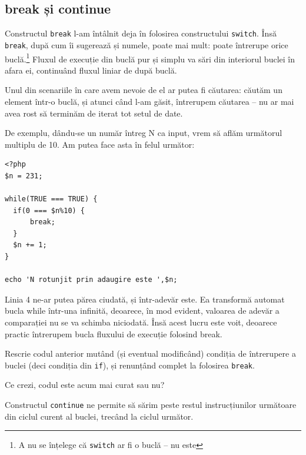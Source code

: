 \subsection{break și continue}
Constructul \texttt{break} l-am întâlnit deja în folosirea constructului
\texttt{switch}. Însă \texttt{break}, după cum îi sugerează și numele, poate
mai mult: poate întrerupe orice buclă.\footnote{A nu se înțelege că \texttt{switch} ar fi o buclă -- nu este}
Fluxul de execuție din buclă pur și simplu
va sări din interiorul buclei în afara ei, continuând fluxul liniar
de după buclă.

Unul din scenariile în care avem nevoie de el ar putea fi căutarea:
căutăm un element într-o buclă, și atunci când l-am găsit, întrerupem
căutarea -- nu ar mai avea rost să terminăm de iterat tot setul de date.

De exemplu, dându-se un număr întreg N ca input, vrem să aflăm următorul
multiplu de 10. Am putea face asta în felul următor:

\begin{lstlisting}
<?php
$n = 231;

while(TRUE === TRUE) {
  if(0 === $n%10) {
	  break;
  }
  $n += 1;
}

echo 'N rotunjit prin adaugire este ',$n;
\end{lstlisting}

Linia 4 ne-ar putea părea ciudată, și într-adevăr este.
Ea transformă automat bucla while într-una infinită,
deoarece, în mod evident, valoarea de adevăr a comparației nu se va schimba
niciodată. Însă acest lucru este voit, deoarece practic întrerupem
bucla fluxului de execuție folosind break.



\begin{Exercise}[title={Majoritatea buclelor infinite pot fi corectate}]
Rescrie codul anterior mutând (și eventual modificând) condiția
de întrerupere a buclei (deci condiția din \texttt{if}),
și renunțând complet la folosirea \texttt{break}.

Ce crezi, codul este acum mai curat sau nu?
\end{Exercise}

Constructul \texttt{continue} ne permite să
sărim peste restul instrucțiunilor următoare
din ciclul curent al buclei, trecând la ciclul următor.

